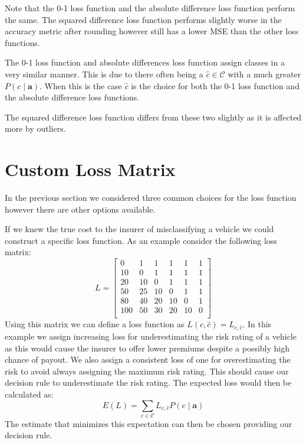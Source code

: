 Note that the 0-1 loss function and the absolute difference loss function perform the same.
The squared difference loss function performs slightly worse in the accuracy metric after rounding however still has a lower MSE than the other loss functions.

The 0-1 loss function and absolute differences loss function assign classes in a very similar manner.
This is due to there often being a $\hat{c} \in \mathcal{C}$ with a much greater $P(c \mid \mathbf{a})$.
When this is the case $\hat{c}$ is the choice for both the 0-1 loss function and the absolute difference loss functions.

The squared difference loss function differs from these two slightly as it is affected more by outliers.

\section{Custom Loss Matrix}
In the previous section we considered three common choices for the loss function however there are other options available.

If we knew the true cost to the insurer of misclassifying a vehicle we could construct a specific loss function.
As an example consider the following loss matrix:
\begin{equation}
	L = 
		\begin{bmatrix}
			0   & 1  & 1  & 1  & 1  & 1 \\
			10  & 0  & 1  & 1  & 1  & 1 \\
			20  & 10 & 0  & 1  & 1  & 1 \\
			50  & 25 & 10 & 0  & 1  & 1 \\
			80  & 40 & 20 & 10 & 0  & 1 \\
			100 & 50 & 30 & 20 & 10 & 0 \\
		\end{bmatrix}
\end{equation}
Using this matrix we can define a loss function as $L(c, \hat{c}) = L_{c,\hat{c}}$.
In this example we assign increasing loss for underestimating the risk rating of a vehicle as this would cause the insurer to offer lower premiums despite a possibly high chance of payout.
We also assign a consistent loss of one for overestimating the risk to avoid always assigning the maximum risk rating.
This should cause our decision rule to underestimate the risk rating.
The expected loss would then be calculated as:
\begin{equation}
	E(L) = \sum_{c \in \mathcal{C}} L_{c,\hat{c}}P(c \mid \mathbf{a})
\end{equation}
The estimate that minimizes this expectation can then be chosen providing our decision rule.

